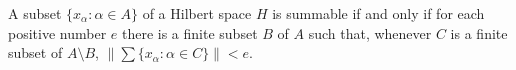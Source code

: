A subset $\{x_\alpha : \alpha \in A\}$ of a Hilbert space $H$ is summable if and only if for each positive number $e$ there is a finite subset $B$ of $A$ such that, whenever $C$ is a finite subset of $A \setminus B$, $\left\|\sum \{x_\alpha : \alpha \in C\}\right\| < e$.

